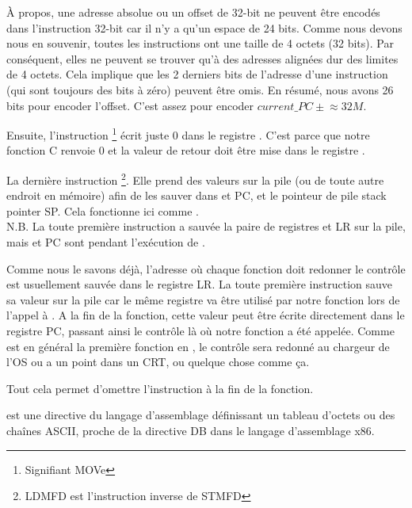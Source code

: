 À propos, une adresse absolue ou un offset de 32-bit ne peuvent être encodés
dans l'instruction 32-bit  car il n'y a qu'un espace de 24 bits.
Comme nous devons nous en souvenir, toutes les instructions ont une taille de
4 octets (32 bits).
Par conséquent, elles ne peuvent se trouver qu'à des adresses alignées dur des
limites de 4 octets.
Cela implique que les 2 derniers bits de l'adresse d'une instruction (qui sont
toujours des bits à zéro) peuvent être omis.
En résumé, nous avons 26 bits pour encoder l'offset. C'est assez pour encoder
$current\_PC \pm{} \approx{}32M$.

Ensuite, l'instruction \footnote{Signifiant MOVe} écrit juste
0 dans le registre .
C'est parce que notre fonction C renvoie 0 et la valeur de retour doit être
mise dans le registre .

La dernière instruction \footnote{\ac{LDMFD} est
l'instruction inverse de \ac{STMFD}}.
Elle prend des valeurs sur la pile (ou de toute autre endroit en mémoire)
afin de les sauver dans  et \ac{PC}, et 
le pointeur de pile \gls{stack pointer} \ac{SP}.
Cela fonctionne ici comme \POP.\\
N.B. La toute première instruction  a sauvée la paire de registres
 et \ac{LR} sur la pile, mais  et \ac{PC} sont 
 pendant l'exécution de .

Comme nous le savons déjà, l'adresse où chaque fonction doit redonner le
contrôle est usuellement sauvée dans le registre \ac{LR}.
La toute première instruction sauve sa valeur sur la pile car le même
registre va être utilisé par notre fonction \main lors de l'appel à \printf.
A la fin de la fonction, cette valeur peut être écrite directement dans le
registre \ac{PC}, passant ainsi le contrôle là où notre fonction a été appelée.
Comme \main est en général la première fonction en \CCpp, le contrôle sera
redonné au chargeur de l'\ac{OS} ou a un point dans un \ac{CRT}, ou quelque
chose comme ça.

Tout cela permet d'omettre l'instruction  à la fin de la fonction.

 est une directive du langage d'assemblage définissant un tableau d'octets
ou des chaînes ASCII, proche de la directive DB dans le langage d'assemblage x86.

